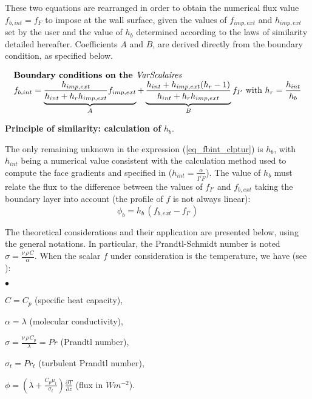 These two equations are rearranged in order to obtain the numerical flux value
$f_{b,int}=f_{F}$ to impose at the wall surface, given the values of
$f_{imp,ext}$ and $h_{imp,ext}$ set by the user and the value of $h_{b}$
determined according to the laws of similarity detailed hereafter. Coefficients $A$
and $B$, are derived directly from the boundary condition, as specified below.

\begin{equation}\label{eq_fbint_clptur}
\begin{array}{l}
\text{\bf Boundary conditions on the {\it VarScalaires} }\\
f_{b,int} =
\underbrace{\displaystyle\frac{h_{imp,ext}}{h_{int}+h_r h_{imp,ext} } f_{imp,ext}}_{A} +
\underbrace{\displaystyle\frac{h_{int}+h_{imp,ext}(h_r-1)}{h_{int}+h_r h_{imp,ext} }}_{B} f_{I'}
\text{  with } h_r=\displaystyle\frac{h_{int}}{h_{b}}
\end{array}
\end{equation}


\newpage
{\bf Principle of similarity: calculation of } $h_b$.

The only remaining unknown in the expression (\ref{eq_fbint_clptur}) is $h_{b}$, with $h_{int}$
being a numerical value consistent with the calculation method used to compute the face
gradients and specified in  ($h_{int}=\displaystyle\frac{\alpha}{\overline{I'F}}$). The
value of $h_{b}$ must relate the flux to the difference between the values of $f_{I'}$ and $f_{b,ext}$
taking the boundary layer into account (the profile of $f$ is not always linear):
\begin{equation}
\phi_b=h_b\,(f_{b,ext}-f_{I'})
\end{equation}

The theoretical considerations and their application are presented below, using the general
notations. In particular, the Prandtl-Schmidt number is noted
$\sigma=\displaystyle\frac{\nu\,\rho\,C}{\alpha}$.
When the scalar $f$ under consideration is the temperature,
we have (see ):
\begin{list}{$\bullet$}{}
\item $C=C_p$ (specific heat capacity),
\item $\alpha=\lambda$ (molecular conductivity),
\item $\sigma = \displaystyle\frac{\nu\,\rho\,C_p}{\lambda} = Pr$
       (Prandtl number),
\item $\sigma_t = Pr_t$ (turbulent Prandtl number),
\item $\phi=\left(\lambda+\displaystyle\frac{C_p\mu_t}{\sigma_t}\right)
        \displaystyle\frac{\partial T}{\partial z}$ (flux in $Wm^{-2}$).
\end{list}


